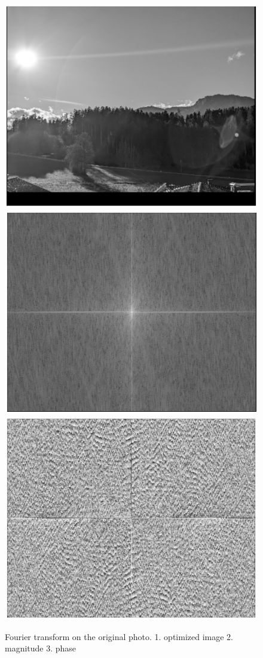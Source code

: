 \documentclass[UTF-8]{article}
\begin{document}
\begin{figure}[H]
	\centering
	\includegraphics[width=0.5\linewidth]{fourier_resized_with_border.png}
	\includegraphics[width=0.5\linewidth]{fourier_resized_magnitude.png}
	\includegraphics[width=0.5\linewidth]{fourier_resized_phase.png}
	\caption{Fourier transform on the original photo. 1. optimized image 2. magnitude 3. phase}
	\label{fig:fourierscaledwithborder}
\end{figure}
\newpage
\end{document}
